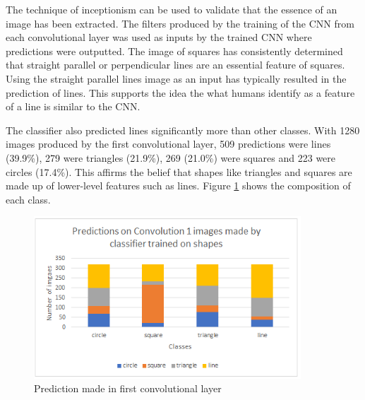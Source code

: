 The technique of inceptionism can be used to validate that the essence of an image has been extracted. The filters produced by the training of the CNN from each convolutional layer was used as inputs by the trained CNN where predictions were outputted. The image of squares has consistently determined that straight parallel or perpendicular lines are an essential feature of squares. Using the straight parallel lines image as an input has typically resulted in the prediction of lines. This supports the idea the what humans identify as a feature of a line is similar to the CNN.  

The classifier also predicted lines significantly more than other classes. With 1280 images produced by the first convolutional layer, 509 predictions were lines (39.9\%), 279 were triangles (21.9\%), 269 (21.0\%) were squares and 223 were circles (17.4\%). This affirms the belief that shapes like triangles and squares are made up of lower-level features such as lines. Figure \ref{fig:graph_conv1} shows the composition of each class. 
\begin{figure}
	\begin{center}
		\includegraphics[width=100mm, scale=1]{graph_conv1.png}
		\caption{Prediction made in first convolutional layer}
		\label{fig:graph_conv1}
	\end{center}
	
\end{figure}

